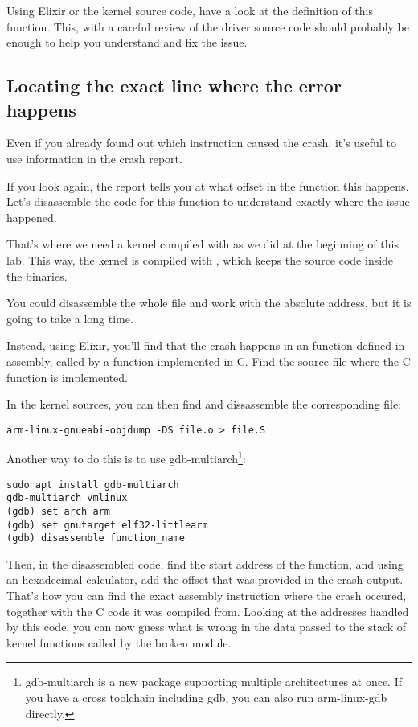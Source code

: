 Using Elixir or the kernel source code, have a look at the definition of this
function. This, with a careful review of the driver source code should
probably be enough to help you understand and fix the issue.

\subsection{Locating the exact line where the error happens}

Even if you already found out which instruction caused the crash, it's
useful to use information in the crash report.

If you look again, the report tells you at what offset in the function
this happens. Let's disassemble the code for this function to
understand exactly where the issue happened.

That's where we need a kernel compiled with 
as we did at the beginning of this lab. This way, the kernel is
compiled with , which keeps the source
code inside the binaries.

You could disassemble the whole  file and work with
the  absolute address, but it is going to take a long time.

Instead, using Elixir, you'll find that the crash happens in an function
defined in assembly, called by a function implemented in C. Find
the  source file where the C function is implemented.

In the kernel sources, you can then find
and dissassemble the corresponding  file:

\begin{verbatim}
arm-linux-gnueabi-objdump -DS file.o > file.S
\end{verbatim}

Another way to do this is to use {gdb-multiarch}\footnote{gdb-multiarch is a new package
supporting multiple architectures at once. If you have a cross
toolchain including gdb, you can also run arm-linux-gdb directly.}:

\begin{verbatim}
sudo apt install gdb-multiarch
gdb-multiarch vmlinux
(gdb) set arch arm
(gdb) set gnutarget elf32-littlearm
(gdb) disassemble function_name
\end{verbatim}

Then, in the disassembled code, find the start address of the
function, and using an hexadecimal calculator, add the offset that
was provided in the crash output. That's how you can find the
exact assembly instruction where the crash occured, together
with the C code it was compiled from. Looking at the addresses
handled by this code, you can now guess what is wrong in the
data passed to the stack of kernel functions called by the
broken module.

